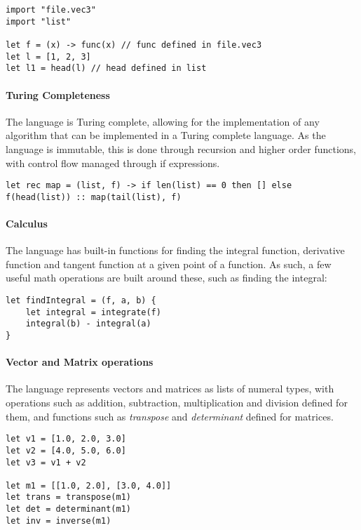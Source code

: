\begin{verbatim}
import "file.vec3"
import "list"

let f = (x) -> func(x) // func defined in file.vec3
let l = [1, 2, 3]
let l1 = head(l) // head defined in list
\end{verbatim}

\paragraph{Turing Completeness} The language is Turing complete, allowing for the implementation of any
algorithm that can be implemented in a Turing complete language.
As the language is immutable, this is done through recursion and higher order functions, with control flow
managed through if expressions.

\begin{verbatim}
let rec map = (list, f) -> if len(list) == 0 then [] else f(head(list)) :: map(tail(list), f)
\end{verbatim}

\paragraph{Calculus} The language has built-in functions for finding the integral function, derivative function
and tangent function at a given point of a function.
As such, a few useful math operations are built around these, such as finding the integral:

\begin{verbatim}
let findIntegral = (f, a, b) {
    let integral = integrate(f)
    integral(b) - integral(a)
}
\end{verbatim}

\paragraph{Vector and Matrix operations} The language represents vectors and matrices as lists of numeral types, with
operations such as addition, subtraction, multiplication and division defined for them, and functions such as \textit{transpose} and \textit{determinant} defined for matrices.

\begin{verbatim}
let v1 = [1.0, 2.0, 3.0]
let v2 = [4.0, 5.0, 6.0]
let v3 = v1 + v2

let m1 = [[1.0, 2.0], [3.0, 4.0]]
let trans = transpose(m1)
let det = determinant(m1)
let inv = inverse(m1)
\end{verbatim}

